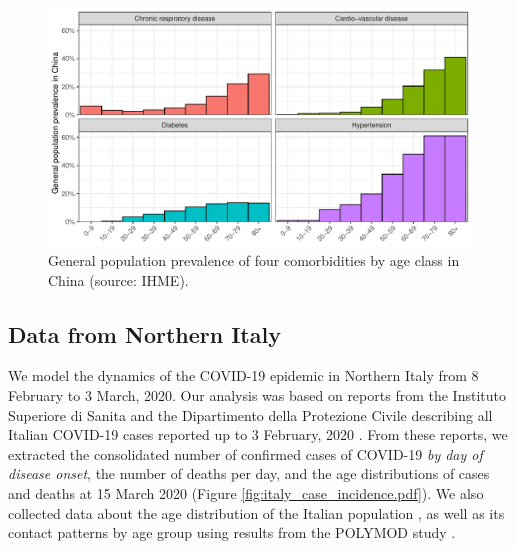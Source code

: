 \documentclass{article}
\begin{document}
\begin{figure}[h]
	\centering
	\includegraphics[width=12cm]{../format_output/figures/comorbidity_china.pdf}
	\caption{General population prevalence of four comorbidities by age class in China (source: IHME). }
	\label{fig:comorbidities}
\end{figure}


\subsection{Data from Northern Italy}
We model the dynamics of the COVID-19 epidemic in Northern Italy from 8 February to 3 March, 2020. Our analysis was based on reports from the Instituto Superiore di Sanita and the Dipartimento della Protezione Civile describing all Italian COVID-19 cases reported up to 3 February, 2020 \cite{Civile,IstitutoSuperiorediSanita}. From these reports, we extracted the consolidated number of confirmed cases of COVID-19 {\em by day of disease onset}, the number of deaths per day, and the age distributions of cases and deaths at 15 March 2020 (Figure \ref{fig:italy_case_incidence.pdf}). 
We also collected data about the age distribution of the Italian population \cite{Worldometers.info}, as well as its contact patterns by age group using results from the POLYMOD study \cite{mossong2008social}.
	
\end{document}
